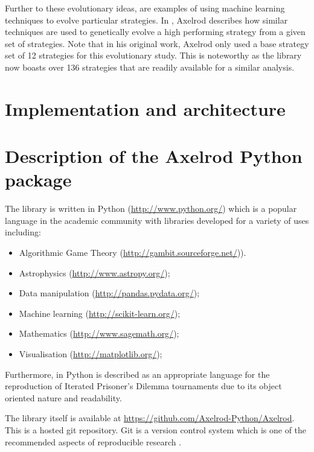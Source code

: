 \documentclass{jors}
\begin{document}
Further to these evolutionary ideas, \cite{Chellapilla1999, DavidB1993} are
examples of using machine learning techniques to evolve particular strategies.
In \cite{Axelrod}, Axelrod describes how similar techniques are used to
genetically evolve a high performing strategy from a given set of strategies.
Note that in his original work, Axelrod only used a base strategy set of 12
strategies for this evolutionary study. This is noteworthy as
the library now boasts over 136 strategies that are
readily available for a similar analysis.

\section*{Implementation and architecture}

\section*{Description of the Axelrod Python package}\label{sec:description-of-axelrod-python}

The library is written in Python (\url{http://www.python.org/}) which is a
popular language in the academic community with libraries developed for a
variety of uses including:

\begin{itemize}[noitemsep,topsep=0pt]
    \item Algorithmic Game Theory \cite{Mckelvey06gambit:software}
          (\url{http://gambit.sourceforge.net/})).
    \item Astrophysics \cite{astropy} (\url{http://www.astropy.org/});
    \item Data manipulation \cite{mckinney-proc-scipy-2010}
          (\url{http://pandas.pydata.org/});
    \item Machine learning \cite{scikit-learn} (\url{http://scikit-learn.org/});
    \item Mathematics \cite{sage} (\url{http://www.sagemath.org/});
    \item Visualisation \cite{Hunter:2007} (\url{http://matplotlib.org/});
\end{itemize}

Furthermore, in \cite{Isaac2008} Python is described as an appropriate language for the
reproduction of Iterated Prisoner's Dilemma tournaments due to its object
oriented nature and readability.

The library itself is available at
\url{https://github.com/Axelrod-Python/Axelrod}. This is a hosted git
repository. Git is a version control system which is one of the
recommended aspects of reproducible research \cite{Crick2014a, Sandve2013}.
\end{document}
